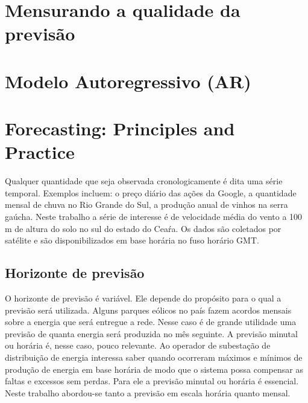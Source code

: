 \documentclass[
	12pt,				%
	openright,			%
	oneside,			%
	a4paper,			%
	english,			%
	french,				%
	spanish,			%
	brazil				%
	]{abntex2}
\begin{document}

\chapter{Mensurando a qualidade da previsão}

\chapter{Modelo Autoregressivo (AR)}

\chapter{Forecasting: Principles and Practice}


Qualquer quantidade que seja observada cronologicamente é dita uma série temporal. Exemplos incluem: o preço diário das ações da Google, a quantidade mensal de chuva no Rio Grande do Sul, a produção anual de vinhos na serra gaúcha. Neste trabalho a série de interesse é de velocidade média do vento a 100 m de altura do solo no sul do estado do Ceaŕa. Os dados são coletados por satélite e são disponibilizados em base horária no fuso horário GMT. 

\section{Horizonte de previsão}

O horizonte de previsão é variável. Ele depende do propósito para o qual a previsão será utilizada. Alguns parques eólicos no país fazem acordos mensais sobre a energia que será entregue a rede. Nesse caso é de grande utilidade uma previsão de quanta energia será produzida no mês seguinte. A previsão minutal ou horária é, nesse caso, pouco relevante.
Ao operador de subestação de distribuição de energia interessa saber quando ocorreram máximos e mínimos de produção de energia em base horária de modo que o sistema possa compensar as faltas e excessos sem perdas. Para ele a previsão minutal ou horária é essencial. Neste trabalho abordou-se tanto a previsão em escala horária quanto mensal.
\end{document}
